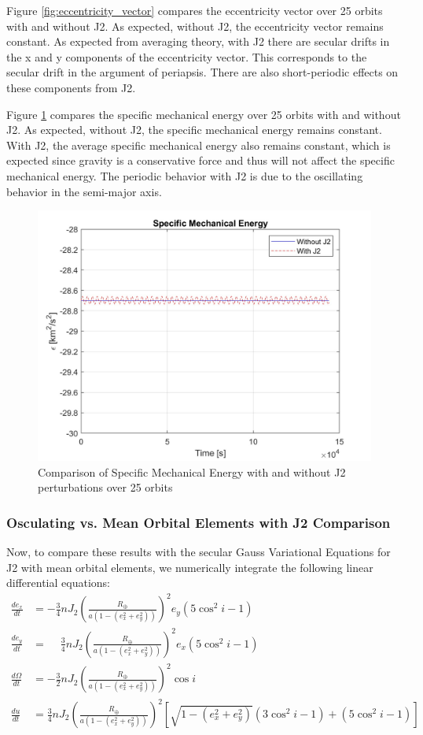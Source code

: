 Figure \ref{fig:eccentricity_vector} compares the eccentricity vector over 25 orbits with and without J2. As expected, without J2, the eccentricity vector remains constant. As expected from averaging theory, with J2 there are secular drifts in the x and y components of the eccentricity vector. This corresponds to the secular drift in the argument of periapsis. There are also short-periodic effects on these components from J2.  


Figure \ref{fig:specific_energy} compares the specific mechanical energy over 25 orbits with and without J2. As expected, without J2, the specific mechanical energy remains constant. With J2, the average specific mechanical energy also remains constant, which is expected since gravity is a conservative force and thus will not affect the specific mechanical energy. The periodic behavior with J2 is due to the oscillating behavior in the semi-major axis. 

\begin{figure}[H]
    \centering
    \includegraphics[width=0.5\linewidth]{PS1/Figures/Epsilon_J2_Comparison.jpg}
    \caption{Comparison of Specific Mechanical Energy with and without J2 perturbations over 25 orbits}
    \label{fig:specific_energy}
\end{figure}

\subsubsection{Osculating vs. Mean Orbital Elements with J2 Comparison}
Now, to compare these results with the secular Gauss Variational Equations for J2 with mean orbital elements, we numerically integrate the following linear differential equations:
\begin{align}
\frac{d e_x}{dt} &= -\frac{3}{4} n J_2 \left( \frac{R_\oplus}{a \left(1 - (e_x^2 + e_y^2)\right)} \right)^2 e_y (5 \cos^2 i - 1) \\
\frac{d e_y}{dt} &= \phantom{-}\frac{3}{4} n J_2 \left( \frac{R_\oplus}{a \left(1 - (e_x^2 + e_y^2)\right)} \right)^2 e_x (5 \cos^2 i - 1) \\
\frac{d\Omega}{dt} &= -\frac{3}{2} n J_2 \left( \frac{R_\oplus}{a \left(1 - (e_x^2 + e_y^2)\right)} \right)^2 \cos i  \\
\frac{du}{dt} &= \frac{3}{4} n J_2 \left( \frac{R_\oplus}{a \left(1 - (e_x^2 + e_y^2)\right)} \right)^2 
\left[ \sqrt{1 - (e_x^2 + e_y^2)} (3 \cos^2 i - 1) + (5 \cos^2 i - 1) \right] \quad 
\end{align}

